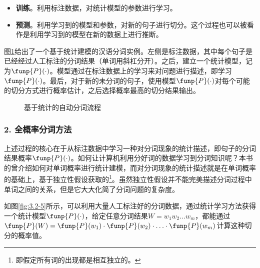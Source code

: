 \begin{itemize}
\vspace{0.5em}
\item {\small\sffamily\bfseries{训练}}。利用标注数据，对统计模型的参数进行学习。
\vspace{0.5em}
\item {\small\sffamily\bfseries{预测}}。利用学习到的模型和参数，对新的句子进行切分。这个过程也可以被看作是利用学习到的模型在新的数据上进行推断。
\vspace{0.5em}
\end{itemize}

\parinterval 图\ref{fig:3.2-4}给出了一个基于统计建模的汉语分词实例。左侧是标注数据，其中每个句子是已经经过人工标注的分词结果（单词用斜杠分开）。之后，建立一个统计模型，记为$\funp{P}(\cdot)$。模型通过在标注数据上的学习来对问题进行描述，即学习$\funp{P}(\cdot)$。最后，对于新的未分词的句子，使用模型$\funp{P}(\cdot)$对每个可能的切分方式进行概率估计，之后选择概率最高的切分结果输出。

\begin{figure}[htp]
\centering

\caption{基于统计的自动分词流程}
\label{fig:3.2-4}
\end{figure}


\subsubsection{2. 全概率分词方法}

\parinterval 上述过程的核心在于从标注数据中学习一种对分词现象的统计描述，即句子的分词结果概率$\funp{P}(\cdot)$。如何让计算机利用分好词的数据学习到分词知识呢？本书的{\chaptertwo}曾介绍如何对单词概率进行统计建模，而对分词现象的统计描述就是在单词概率的基础上，基于独立性假设获取的\footnote{即假定所有词的出现都是相互独立的。}。虽然独立性假设并不能完美描述分词过程中单词之间的关系，但是它大大化简了分词问题的复杂度。

\parinterval 如图\ref{fig:3.2-5}所示，可以利用大量人工标注好的分词数据，通过统计学习方法获得一个统计模型$\funp{P}(\cdot)$，给定任意分词结果$W = w_1w_2 \ldots w_m$，都能通过$\funp{P}(W)=\funp{P}(w_1) \cdot \funp{P}(w_2) \cdot \ldots \cdot \funp{P}(w_m)
$计算这种切分的概率值。

